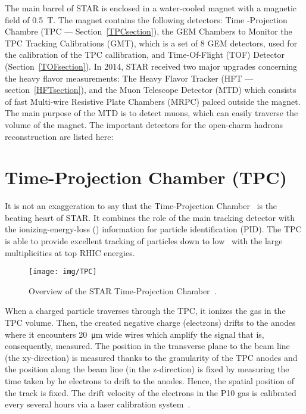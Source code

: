 The main barrel of STAR is enclosed in a water-cooled magnet with a magnetic field of \SI{0.5}{\tesla}. The magnet contains the
following detectors: Time -Projection Chambre (TPC --- Section~\ref{TPCsection}), the GEM
Chambers to Monitor the TPC Tracking Calibrations (GMT), 
which is a set of 8 GEM detectors, used for the calibration of the TPC callibration, and Time-Of-Flight
(TOF) Detector (Section~\ref{TOFsection}). In 2014, STAR received two major upgrades
concerning the heavy flavor measurements: The Heavy Flavor Tracker (HFT --- section~\ref{HFTsection}), and the Muon Telescope Detector (MTD) which consists of fast Multi-wire Resistive Plate Chambers (MRPC) palced
outside the magnet. The main purpose of the MTD is to detect muons, which can easily traverse the volume of the magnet. The important
detectors for the open-charm hadrons reconstruction are listed here:

\section{Time-Projection Chamber (TPC)\label{TPCsection}} 
It is not an exaggeration to say that the Time-Projection Chamber~\cite{TpcNim} is the beating heart of STAR. It combines the role of the main tracking detector with the ionizing-energy-loss
(\dedx) information for particle identification (PID). The TPC is able to provide excellent tracking of particles down to low \pt\ with the large multiplicities at top RHIC energies.

\begin{figure}[htb]
\begin{center}
 \texttt{[image: img/TPC]}\\
\end{center}
\caption{\label{TPC}Overview of the STAR Time-Projection Chamber~\cite{TpcNim}.}
\end{figure}


 

When a charged particle traverses through the TPC, it ionizes the gas in the TPC volume. Then, the created negative 
charge (electrons) drifts to the anodes where it encounters \SI{20}{\micro\metre} wide wires which amplify the signal that is,
consequently, measured. The position in the transverse plane to the beam line (the xy-direction) is measured thanks to the
granularity of the TPC anodes and the position along the beam line (in the z-direction) is fixed by measuring the time taken by
he electrons to drift to the anodes. Hence, the spatial position of the track is fixed. The drift velocity of the electrons
in the P10 gas is calibrated every several hours via a laser calibration system~\cite{laser}. 



